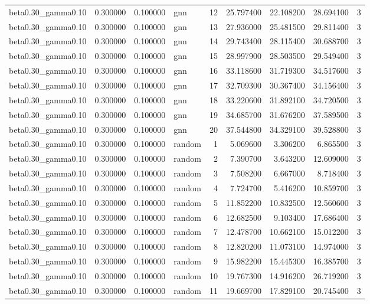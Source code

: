 \begin{tabular}{lrrlrrrrr}
beta0.30\_gamma0.10 & 0.300000 & 0.100000 & gnn & 12 & 25.797400 & 22.108200 & 28.694100 & 3 \\
beta0.30\_gamma0.10 & 0.300000 & 0.100000 & gnn & 13 & 27.936000 & 25.481500 & 29.811400 & 3 \\
beta0.30\_gamma0.10 & 0.300000 & 0.100000 & gnn & 14 & 29.743400 & 28.115400 & 30.688700 & 3 \\
beta0.30\_gamma0.10 & 0.300000 & 0.100000 & gnn & 15 & 28.997900 & 28.503500 & 29.549400 & 3 \\
beta0.30\_gamma0.10 & 0.300000 & 0.100000 & gnn & 16 & 33.118600 & 31.719300 & 34.517600 & 3 \\
beta0.30\_gamma0.10 & 0.300000 & 0.100000 & gnn & 17 & 32.709300 & 30.367400 & 34.156400 & 3 \\
beta0.30\_gamma0.10 & 0.300000 & 0.100000 & gnn & 18 & 33.220600 & 31.892100 & 34.720500 & 3 \\
beta0.30\_gamma0.10 & 0.300000 & 0.100000 & gnn & 19 & 34.685700 & 31.676200 & 37.589500 & 3 \\
beta0.30\_gamma0.10 & 0.300000 & 0.100000 & gnn & 20 & 37.544800 & 34.329100 & 39.528800 & 3 \\
beta0.30\_gamma0.10 & 0.300000 & 0.100000 & random & 1 & 5.069600 & 3.306200 & 6.865500 & 3 \\
beta0.30\_gamma0.10 & 0.300000 & 0.100000 & random & 2 & 7.390700 & 3.643200 & 12.609000 & 3 \\
beta0.30\_gamma0.10 & 0.300000 & 0.100000 & random & 3 & 7.508200 & 6.667000 & 8.718400 & 3 \\
beta0.30\_gamma0.10 & 0.300000 & 0.100000 & random & 4 & 7.724700 & 5.416200 & 10.859700 & 3 \\
beta0.30\_gamma0.10 & 0.300000 & 0.100000 & random & 5 & 11.852200 & 10.832500 & 12.560600 & 3 \\
beta0.30\_gamma0.10 & 0.300000 & 0.100000 & random & 6 & 12.682500 & 9.103400 & 17.686400 & 3 \\
beta0.30\_gamma0.10 & 0.300000 & 0.100000 & random & 7 & 12.478700 & 10.662100 & 15.012200 & 3 \\
beta0.30\_gamma0.10 & 0.300000 & 0.100000 & random & 8 & 12.820200 & 11.073100 & 14.974000 & 3 \\
beta0.30\_gamma0.10 & 0.300000 & 0.100000 & random & 9 & 15.982200 & 15.445300 & 16.385700 & 3 \\
beta0.30\_gamma0.10 & 0.300000 & 0.100000 & random & 10 & 19.767300 & 14.916200 & 26.719200 & 3 \\
beta0.30\_gamma0.10 & 0.300000 & 0.100000 & random & 11 & 19.669700 & 17.829100 & 20.745400 & 3 \\

\end{tabular}
